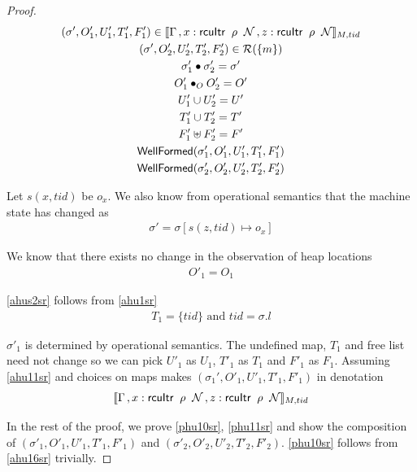 \begin{proof}
\begin{gather}\label{phu5sr}
\begin{aligned}
(\sigma',O'_{1},U'_{1}, T'_{1}, F'_1)  \in \llbracket \Gamma\,, \rcuitrT{x}{G}{k}{k+1}{\_}\, , \rcuitrT{z}{G}{k}{k+1}{\_}  \rrbracket_{M,tid}
\end{aligned}\\
\label{phu6sr}
(\sigma',O'_{2},U'_{2}, T'_{2}, F'_2) \in \mathcal{R}(\{m\})
\\
\label{ahusigsr'}
\sigma'_1 \bullet \sigma'_2 = \sigma'
\\
\label{phu7sr}
O'_{1} \bullet_{O} O'_{2} = O'
\\
\label{phu8sr}
U'_{1} \cup U'_{2} = U'
\\
\label{phu9sr}
T'_{1} \cup T'_{2} = T'
\\
\label{phusrf}
F'_1 \uplus F'_2 = F'
\\
\label{phu10sr}
\textsf{WellFormed}(\sigma_1',O'_{1},U'_{1},T'_{1},F'_1) \\
\label{phu11sr}
\textsf{WellFormed}(\sigma_2',O'_{2},U'_{2},T'_{2}, F'_2)
\end{gather}

Let $s(x,tid)$ be $o_x$. We also know from operational semantics that the machine state has changed as 
\begin{gather}\label{ahussr}
\sigma' =  \sigma[s(z,tid) \mapsto o_x ]
\end{gather}

We know that there exists no change in the observation of heap locations
\begin{gather}\label{ahus1sr}
O'_1 =  O_1
\end{gather}

\ref{ahus2sr} follows from \ref{ahu1sr}
\begin{gather}\label{ahus2sr}
  T_1 = \{tid\} \text{ and } tid = \sigma.l
\end{gather}

$\sigma'_1$ is determined by operational semantics. The undefined map, $T_1$ and free list need not change so we can pick $U'_1$ as $U_1$, $T'_1$  as $T_1$ and $F'_1$ as $F_1$. Assuming \ref{ahu11sr} and choices on maps makes $(\sigma_1',O'_{1},U'_{1}, T'_{1},F'_1)$ in denotation
\[\llbracket \Gamma\,, \rcuitrT{x}{G}{k}{k+1}{\_}\, , \rcuitrT{z}{G}{k}{k+1}{\_}  \rrbracket_{M,tid}\]

In the rest of the proof, we prove \ref{phu10sr}, \ref{phu11sr} and show the composition of $(\sigma'_1, O'_1, U'_1,T'_1,F'_1)$ and  $(\sigma'_2, O'_2, U'_2,T'_2,F'_2)$. \ref{phu10sr} follows from \ref{ahu16sr} trivially.


\end{proof}
